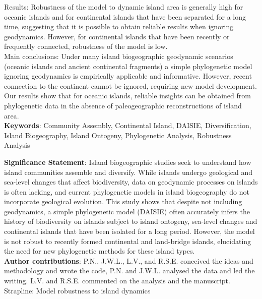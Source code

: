 \documentclass{article}
\begin{document}
\noindent Results: Robustness of the model to dynamic island area is generally high for oceanic islands and for continental islands that have been separated for a long time, suggesting that it is possible to obtain reliable results when ignoring geodynamics. However, for continental islands that have been recently or frequently connected, robustness of the model is low. \\

\noindent Main conclusions: Under many island biogeographic geodynamic scenarios (oceanic islands and ancient continental fragments) a simple phylogenetic model ignoring geodynamics is empirically applicable and informative. However, recent connection to the continent cannot be ignored, requiring new model development. Our results show that for oceanic islands, reliable insights can be obtained from phylogenetic data in the absence of paleogeographic reconstructions of island area. \\

\noindent \textbf{Keywords}: Community Assembly, Continental Island, DAISIE, Diversification, Island Biogeography, Island Ontogeny, Phylogenetic Analysis, Robustness Analysis \\

\clearpage

\noindent \textbf{Significance Statement}: Island biogeographic studies seek to understand how island communities assemble and diversify. While islands undergo geological and sea-level changes that affect biodiversity, data on geodynamic processes on islands is often lacking, and current phylogenetic models in island biogeography do not incorporate geological evolution. This study shows that despite not including geodynamics, a simple phylogenetic model (DAISIE) often accurately infers the history of biodiversity on islands subject to island ontogeny, sea-level changes and continental islands that have been isolated for a long period. However, the model is not robust to recently formed continental and land-bridge islands, elucidating the need for new phylogenetic methods for these island types. \\

\noindent \textbf{Author contributions}: P.N., J.W.L., L.V., and R.S.E. conceived the ideas and methodology and wrote the code, P.N. and J.W.L. analysed the data and led the writing. L.V. and R.S.E. commented on the analysis and the manuscript.\\

Strapline: Model robustness to island dynamics
\end{document}
